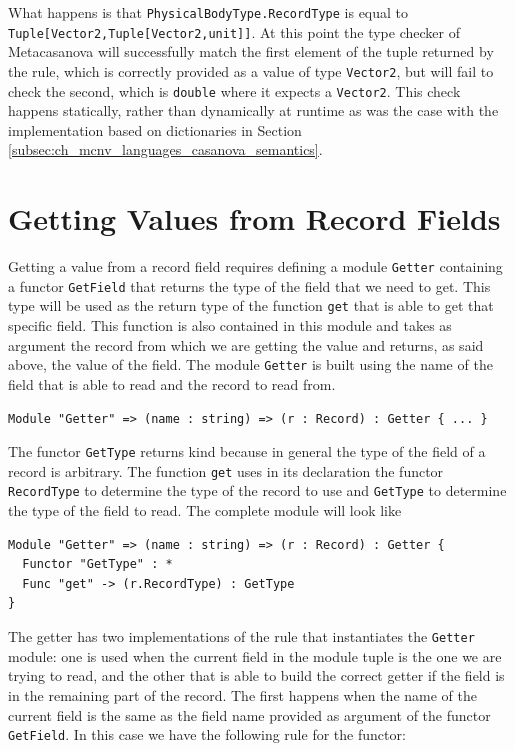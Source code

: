 \noindent
What happens is that \texttt{PhysicalBodyType.RecordType} is equal to\\ \texttt{Tuple[Vector2,Tuple[Vector2,unit]]}. At this point the type checker of Metacasanova will successfully match the first element of the tuple returned by the rule, which is correctly provided as a value of type \texttt{Vector2}, but will fail to check the second, which is \texttt{double} where it expects a \texttt{Vector2}. This check happens statically, rather than dynamically at runtime as was the case with the implementation based on dictionaries in Section \ref{subsec:ch_mcnv_languages_casanova_semantics}.

\section{Getting Values from Record Fields}
\label{sec:ch_functors_record_getter}
Getting a value from a record field requires defining a module \texttt{Getter} containing a functor \texttt{GetField} that returns the type of the field that we need to get. This type will be used as the return type of the function \texttt{get} that is able to get that specific field. This function is also contained in this module and takes as argument the record from which we are getting the value and returns, as said above, the value of the field. The module \texttt{Getter} is built using the name of the field that is able to read and the record to read from.

\begin{lstlisting}
Module "Getter" => (name : string) => (r : Record) : Getter { ... }
\end{lstlisting}

The functor \texttt{GetType} returns kind because in general the type of the field of a record is arbitrary. The function \texttt{get} uses in its declaration the functor \texttt{RecordType} to determine the type of the record to use and \texttt{GetType} to determine the type of the field to read. The complete module will look like

\begin{lstlisting}
Module "Getter" => (name : string) => (r : Record) : Getter {
  Functor "GetType" : *
  Func "get" -> (r.RecordType) : GetType
}
\end{lstlisting}

\noindent
The getter has two implementations of the rule that instantiates the \texttt{Getter} module: one is used when the current field in the module tuple is the one we are trying to read, and the other that is able to build the correct getter if the field is in the remaining part of the record. The first happens when the name of the current field is the same as the field name provided as argument of the functor \texttt{GetField}. In this case we have the following rule for the functor:

